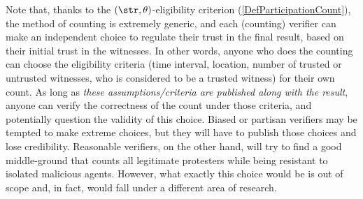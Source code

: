 Note that, thanks to the \((\str,\theta)\)-eligibility criterion
(\cref{DefParticipationCount}), the method of counting is extremely
generic, and each (counting) verifier can make an independent choice to regulate their trust in the final result, based on their initial trust in the witnesses. In other words, anyone who does the counting can choose the eligibility
criteria (time interval, location, number of trusted or untrusted witnesses, 
who is considered to be a trusted witness) for their own count.
As long as \emph{these assumptions/criteria are published along with the 
result}, anyone can verify the correctness of the count under those criteria, 
and potentially question the validity of this choice. Biased or partisan 
verifiers may be tempted to make extreme choices, but they will have to publish 
those choices and lose credibility. Reasonable verifiers, on the other hand, 
will try to find a good middle-ground that counts all legitimate protesters 
while being resistant to isolated malicious agents.
However, what exactly this choice would be is out of scope and, in fact, would 
fall under a different area of research.


